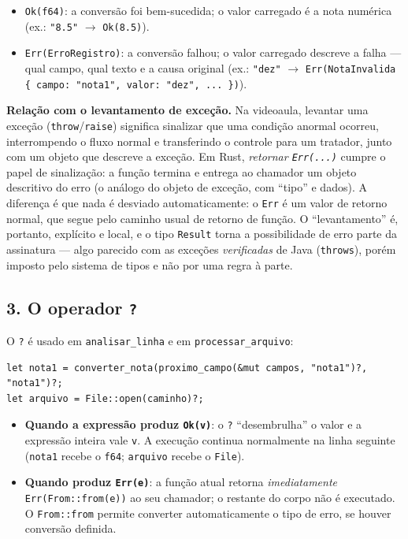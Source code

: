 \documentclass[11pt,a4paper]{article}
\newcommand{\code}[1]{\texttt{#1}}
\begin{document}
\begin{itemize}
  \item \code{Ok(f64)}: a conversão foi bem-sucedida; o valor carregado é a
    nota numérica (ex.: \code{"8.5"} $\to$ \code{Ok(8.5)}).
  \item \code{Err(ErroRegistro)}: a conversão falhou; o valor carregado
    descreve a falha --- qual campo, qual texto e a causa original
    (ex.: \code{"dez"} $\to$ \code{Err(NotaInvalida \{ campo: "nota1",
    valor: "dez", ... \})}).
\end{itemize}

\textbf{Relação com o levantamento de exceção.} Na videoaula, levantar uma
exceção (\code{throw}/\code{raise}) significa sinalizar que uma condição
anormal ocorreu, interrompendo o fluxo normal e transferindo o controle
para um tratador, junto com um objeto que descreve a exceção. Em Rust,
\emph{retornar \code{Err(...)}} cumpre o papel de sinalização: a função
termina e entrega ao chamador um objeto descritivo do erro (o análogo do
objeto de exceção, com ``tipo'' e dados). A diferença é que nada é
desviado automaticamente: o \code{Err} é um valor de retorno normal, que
segue pelo caminho usual de retorno de função. O ``levantamento'' é,
portanto, explícito e local, e o tipo \code{Result} torna a possibilidade
de erro parte da assinatura --- algo parecido com as exceções
\emph{verificadas} de Java (\code{throws}), porém imposto pelo sistema de
tipos e não por uma regra à parte.

\subsection*{3. O operador \code{?}}

O \code{?} é usado em \code{analisar\_linha} e em \code{processar\_arquivo}:

\begin{lstlisting}[numbers=none]
let nota1 = converter_nota(proximo_campo(&mut campos, "nota1")?, "nota1")?;
let arquivo = File::open(caminho)?;
\end{lstlisting}

\begin{itemize}
  \item \textbf{Quando a expressão produz \code{Ok(v)}}: o \code{?}
    ``desembrulha'' o valor e a expressão inteira vale \code{v}. A execução
    continua normalmente na linha seguinte (\code{nota1} recebe o
    \code{f64}; \code{arquivo} recebe o \code{File}).
  \item \textbf{Quando produz \code{Err(e)}}: a função atual retorna
    \emph{imediatamente} \code{Err(From::from(e))} ao seu chamador; o
    restante do corpo não é executado. O \code{From::from} permite converter
    automaticamente o tipo de erro, se houver conversão definida.
\end{itemize}
\end{document}
